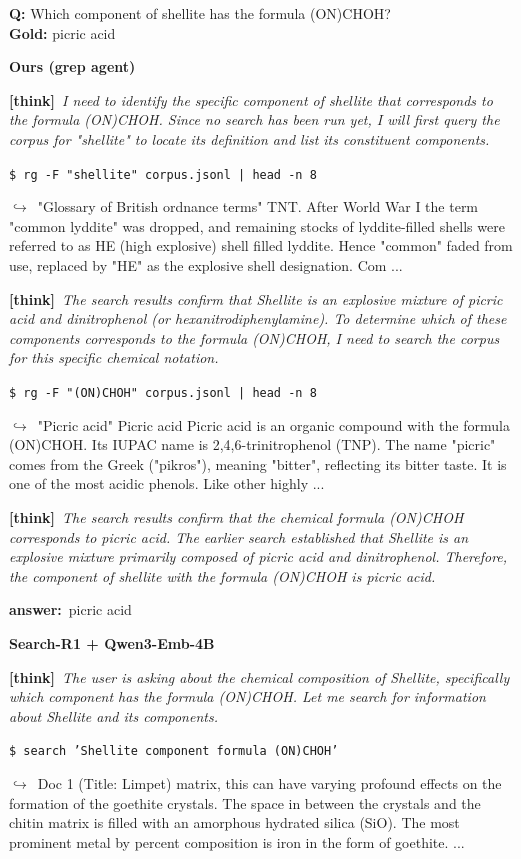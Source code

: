 \documentclass{article} %
\newcommand{\cmark}{\textcolor{green!45!black}{\ding{51}}}
\newcommand{\xmark}{\textcolor{red!60!black}{\ding{55}}}
\newcommand{\winbadge}{\colorbox{green!50!black}{\textcolor{white}{\scriptsize\bfseries\,WIN\,}}}
\newcommand{\thk}[1]{{\footnotesize\textcolor{violet!75!black}{\textbf{[think]}}\ \textit{#1}\par}}
\newcommand{\cmd}[1]{{\footnotesize\texttt{\textcolor{blue!35!black}{\$\ #1}}\par}}
\newcommand{\retr}[1]{{\footnotesize\textcolor{black!65}{\quad$\hookrightarrow$\ #1}\par}}
\newcommand{\ans}[1]{{\footnotesize\textbf{answer:}\ #1\par}}
\begin{document}
\begin{cmpbox}[label={ex:hotpot-formula},title={\winbadge\ \ \textsc{HotpotQA -- symbolic / rare-token match}}]
\textbf{Q:} Which component of shellite has the formula (ON)CHOH?\\[1pt]
\textbf{Gold:} picric acid\par\smallskip
\textbf{Ours (grep agent)}~\cmark\par
  \thk{I need to identify the specific component of shellite that corresponds to the formula (ON)CHOH. Since no search has been run yet, I will first query the corpus for "shellite" to locate its definition and list its constituent components.}
  \cmd{rg -F "shellite" corpus.jsonl | head -n 8}
  \retr{"Glossary of British ordnance terms" TNT. After World War I the term "common lyddite" was dropped, and remaining stocks of lyddite-filled shells were referred to as HE (high explosive) shell filled lyddite. Hence "common" faded from use, replaced by "HE" as the explosive shell designation. Com ...}
  \thk{The search results confirm that Shellite is an explosive mixture of picric acid and dinitrophenol (or hexanitrodiphenylamine). To determine which of these components corresponds to the formula (ON)CHOH, I need to search the corpus for this specific chemical notation.}
  \cmd{rg -F "(ON)CHOH" corpus.jsonl | head -n 8}
  \retr{"Picric acid" Picric acid Picric acid is an organic compound with the formula (ON)CHOH. Its IUPAC name is 2,4,6-trinitrophenol (TNP). The name "picric" comes from the Greek ("pikros"), meaning "bitter", reflecting its bitter taste. It is one of the most acidic phenols. Like other highly ...}
  \thk{The search results confirm that the chemical formula (ON)CHOH corresponds to picric acid. The earlier search established that Shellite is an explosive mixture primarily composed of picric acid and dinitrophenol. Therefore, the component of shellite with the formula (ON)CHOH is picric acid.}
  \ans{picric acid}
\smallskip\par\textbf{Search-R1 + Qwen3-Emb-4B}~\xmark\par
  \thk{The user is asking about the chemical composition of Shellite, specifically which component has the formula (ON)CHOH. Let me search for information about Shellite and its components.}
  \cmd{search 'Shellite component formula (ON)CHOH'}
  \retr{Doc 1 (Title: Limpet) matrix, this can have varying profound effects on the formation of the goethite crystals. The space in between the crystals and the chitin matrix is filled with an amorphous hydrated silica (SiO). The most prominent metal by percent composition is iron in the form of goethite. ...}

\end{cmpbox}
\end{document}
